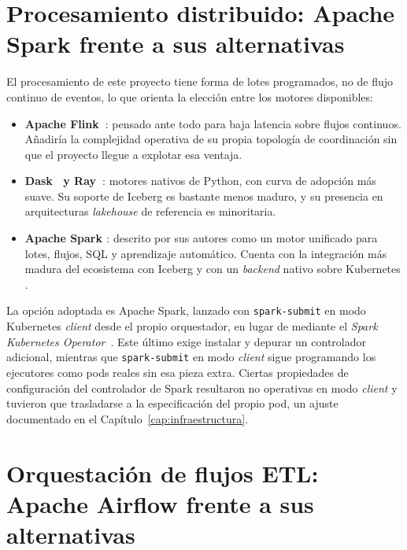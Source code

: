 \section{Procesamiento distribuido: Apache Spark frente a sus alternativas}
\label{sec:estado_arte_spark}

El procesamiento de este proyecto tiene forma de lotes programados, no de
flujo continuo de eventos, lo que orienta la elección entre los motores
disponibles:

\begin{itemize}
  \item \textbf{Apache Flink~\cite{apache_flink_docs}}: pensado ante todo
  para baja latencia sobre flujos continuos. Añadiría la complejidad
  operativa de su propia topología de coordinación sin que el proyecto
  llegue a explotar esa ventaja.
  \item \textbf{Dask~\cite{dask_docs} y Ray~\cite{ray_docs}}: motores
  nativos de Python, con curva de adopción más suave. Su soporte de
  Iceberg es bastante menos maduro, y su presencia en arquitecturas
  \textit{lakehouse} de referencia es minoritaria.
  \item \textbf{Apache Spark \cite{zaharia_spark_2016}}: descrito por sus
  autores como un motor unificado para lotes, flujos, SQL y aprendizaje
  automático. Cuenta con la integración más madura del ecosistema con
  Iceberg y con un \textit{backend} nativo sobre Kubernetes
  \cite{apache_spark_k8s_docs}.
\end{itemize}

La opción adoptada es Apache Spark, lanzado con \texttt{spark-submit} en
modo Kubernetes \textit{client} desde el propio orquestador, en lugar de
mediante el \textit{Spark Kubernetes Operator}~\cite{spark_kubernetes_operator_docs}.
Este último exige instalar y depurar un controlador adicional, mientras
que \texttt{spark-submit} en modo \textit{client} sigue programando los
ejecutores como pods reales sin esa pieza extra. Ciertas propiedades de
configuración del controlador de Spark resultaron no operativas en modo
\textit{client} y tuvieron que trasladarse a la especificación del propio
pod, un ajuste documentado en el Capítulo~\ref{cap:infraestructura}.

\section{Orquestación de flujos ETL: Apache Airflow frente a sus alternativas}
\label{sec:estado_arte_airflow}

